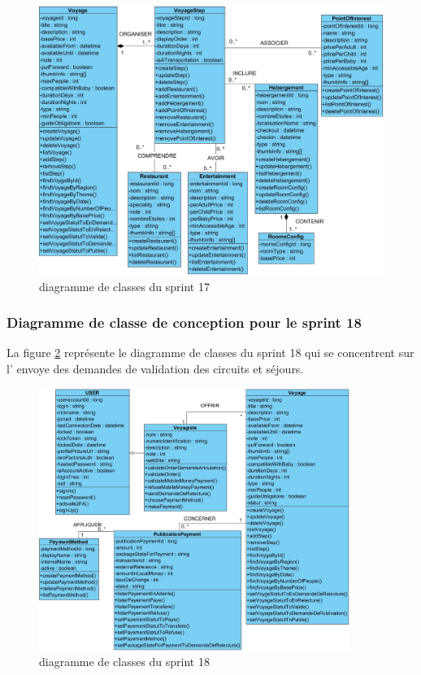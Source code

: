 \documentclass[12pt]{report}
\begin{document}
			\begin{figure}[h]
				\centering
				\includegraphics[width=\textwidth]{sprint17.jpg}
				\caption{diagramme de classes du sprint 17}
				\label{fig:sprint17}
			\end{figure}
			\FloatBarrier

			\subsubsection{Diagramme de classe de conception pour le sprint 18}
				
			\hspace{15pt} La figure \ref{fig:sprint18} représente le diagramme de classes du sprint 18 qui se concentrent sur l' envoye des demandes de validation des circuits et séjours.


			\begin{figure}[h]
				\centering
				\includegraphics[width=0.9\textwidth]{sprint18.jpg}
				\caption{diagramme de classes du sprint 18}
				\label{fig:sprint18}
			\end{figure}
			\FloatBarrier
\end{document}

